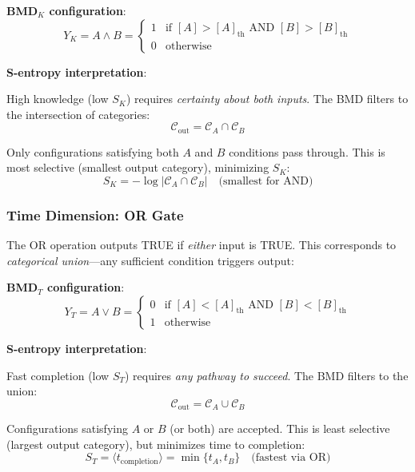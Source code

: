 \documentclass[11pt,a4paper]{article}
\begin{document}
\textbf{BMD$_K$ configuration}:
\begin{equation}
Y_K = A \land B = \begin{cases}
1 & \text{if } [A] > [A]_{\text{th}} \text{ AND } [B] > [B]_{\text{th}} \\
0 & \text{otherwise}
\end{cases}
\end{equation}

\textbf{S-entropy interpretation}:

High knowledge (low $S_K$) requires \textit{certainty about both inputs}. The BMD filters to the intersection of categories:
\begin{equation}
\mathcal{C}_{\text{out}} = \mathcal{C}_A \cap \mathcal{C}_B
\end{equation}

Only configurations satisfying both $A$ and $B$ conditions pass through. This is most selective (smallest output category), minimizing $S_K$:
\begin{equation}
S_K = -\log|\mathcal{C}_A \cap \mathcal{C}_B| \quad \text{(smallest for AND)}
\end{equation}

\subsubsection{Time Dimension: OR Gate}

The OR operation outputs TRUE if \textit{either} input is TRUE. This corresponds to \textit{categorical union}—any sufficient condition triggers output:

\textbf{BMD$_T$ configuration}:
\begin{equation}
Y_T = A \lor B = \begin{cases}
0 & \text{if } [A] < [A]_{\text{th}} \text{ AND } [B] < [B]_{\text{th}} \\
1 & \text{otherwise}
\end{cases}
\end{equation}

\textbf{S-entropy interpretation}:

Fast completion (low $S_T$) requires \textit{any pathway to succeed}. The BMD filters to the union:
\begin{equation}
\mathcal{C}_{\text{out}} = \mathcal{C}_A \cup \mathcal{C}_B
\end{equation}

Configurations satisfying $A$ or $B$ (or both) are accepted. This is least selective (largest output category), but minimizes time to completion:
\begin{equation}
S_T = \langle t_{\text{completion}} \rangle = \min\{t_A, t_B\} \quad \text{(fastest via OR)}
\end{equation}
\end{document}

